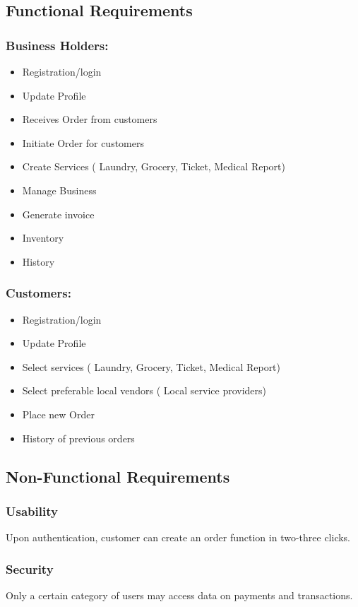 \documentclass[13pt]{extarticle}
\begin{document}
\subsection{Functional Requirements}
\subsubsection{Business Holders:}
\begin{itemize}
    \item Registration/login 
    \item Update Profile
\item Receives Order from customers
\item Initiate Order for customers
\item Create Services ( Laundry, Grocery, Ticket, Medical Report)
\item Manage Business
 \item Generate invoice 
 \item Inventory
 \item History
\end{itemize}
\subsubsection{Customers:}
\begin{itemize}
    \item Registration/login 
    \item Update Profile
\item Select services ( Laundry, Grocery, Ticket, Medical Report)
\item Select preferable local vendors ( Local service providers) 
\item Place new Order
\item History of previous orders
\end{itemize}
\newpage
\subsection{Non-Functional Requirements}
\subsubsection{Usability}
Upon authentication, customer can create an order function in two-three clicks.
\subsubsection{Security}
Only a certain category of users may access data on payments and transactions.
\end{document}
